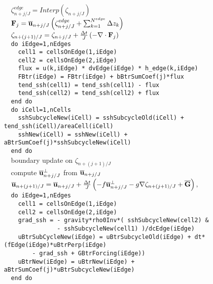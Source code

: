 \documentclass[11pt]{report}
\begin{document}
\verb|  |$\zeta_{n+j/J}^{edge} = Interp(\zeta_{n+j/J}) $\\
\verb|  |${\bf F}_j = \overline{\bf u}_{n+j/J} 
\left(\zeta_{n+j/J}^{edge} + \sum_{k=1}^{N^{edge}} \Delta z_k \right)$\\
\verb|  |$\zeta_{n+(j+1)/J} = \zeta_{n+j/J} + \frac{\Delta t}{J} \left( -
 \nabla \cdot {\bf F}_j \right) $\\
\verb|  do iEdge=1,nEdges|\\
\verb|    cell1 = cellsOnEdge(1,iEdge)|\\
\verb|    cell2 = cellsOnEdge(2,iEdge)|\\
\verb|    flux = u(k,iEdge) * dvEdge(iEdge) * h_edge(k,iEdge)|\\
\verb|    FBtr(iEdge) = FBtr(iEdge) + bBtrSumCoef(j)*flux |\\
\verb|    tend_ssh(cell1) = tend_ssh(cell1) - flux|\\
\verb|    tend_ssh(cell2) = tend_ssh(cell2) + flux|\\
\verb|  end do|\\
\verb|  do iCell=1,nCells|\\
\verb|    sshSubcycleNew(iCell) = sshSubcycleOld(iCell) + tend_ssh(iCell)/areaCell(iCell)|\\
\verb|    sshNew(iCell) = sshNew(iCell) + aBtrSumCoef(j)*sshSubcycleNew(iCell)|\\
\verb|  end do|\\

\verb|  |boundary update on $\zeta_{n+(j+1)/J} $\\

\verb|  |compute $\overline{\bf u}_{n+j/J}^{\perp}$ from $\overline{\bf u}_{n+j/J} $\\ 
\verb|  |$\overline{\bf u}_{n+(j+1)/J} = \overline{\bf u}_{n+j/J} + \frac{\Delta t}{J} \left(
- f\overline{\bf u}_{n+j/J}^{\perp}
- g\nabla \zeta_{n+(j+1)/J} + {\overline {\bf G}}
\right),$\\
\verb|  do iEdge=1,nEdges|\\
\verb|    cell1 = cellsOnEdge(1,iEdge)|\\
\verb|    cell2 = cellsOnEdge(2,iEdge)|\\
\verb|    grad_ssh = - gravity*rho0Inv*( sshSubcycleNew(cell2) &|\\
\verb|               - sshSubcycleNew(cell1) )/dcEdge(iEdge)|\\
\verb|    uBtrSubCycleNew(iEdge) = uBtrSubcycleOld(iEdge) + dt*(fEdge(iEdge)*uBtrPerp(iEdge) |\\
\verb|        - grad_ssh + GBtrForcing(iEdge))|\\
\verb|    uBtrNew(iEdge) = uBtrNew(iEdge) + aBtrSumCoef(j)*uBtrSubcycleNew(iEdge)|\\
\verb|  end do|\\
\end{document}
